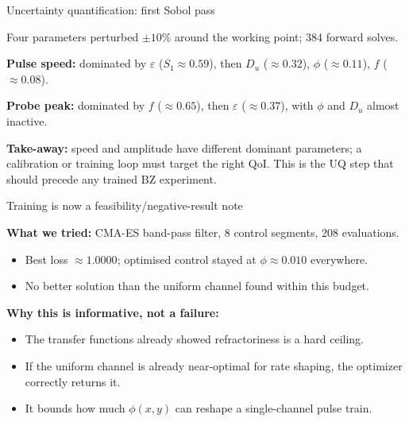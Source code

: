 \documentclass[aspectratio=169,11pt]{beamer}
\begin{document}
\begin{frame}{Uncertainty quantification: first Sobol pass}

Four parameters perturbed $\pm 10\%$ around the working point; 384 forward solves.

\vspace{0.3cm}
\textbf{Pulse speed:} dominated by $\varepsilon$ ($S_1 \approx 0.59$), then $D_u$ ($\approx 0.32$), $\phi$ ($\approx 0.11$), $f$ ($\approx 0.08$).

\vspace{0.2cm}
\textbf{Probe peak:} dominated by $f$ ($\approx 0.65$), then $\varepsilon$ ($\approx 0.37$), with $\phi$ and $D_u$ almost inactive.

\vspace{0.3cm}
\textbf{Take-away:} speed and amplitude have different dominant parameters; a calibration or training loop must target the right QoI. This is the UQ step that should precede any trained BZ experiment.

\end{frame}

\begin{frame}{Training is now a feasibility/negative-result note}

\textbf{What we tried:} CMA-ES band-pass filter, 8 control segments, 208 evaluations.
\begin{itemize}
    \item Best loss $\approx 1.0000$; optimised control stayed at $\phi \approx 0.010$ everywhere.
    \item No better solution than the uniform channel found within this budget.
\end{itemize}

\vspace{0.3cm}
\textbf{Why this is informative, not a failure:}
\begin{itemize}
    \item The transfer functions already showed refractoriness is a hard ceiling.
    \item If the uniform channel is already near-optimal for rate shaping, the optimizer correctly returns it.
    \item It bounds how much $\phi(x,y)$ can reshape a single-channel pulse train.
\end{itemize}

\end{frame}
\end{document}
